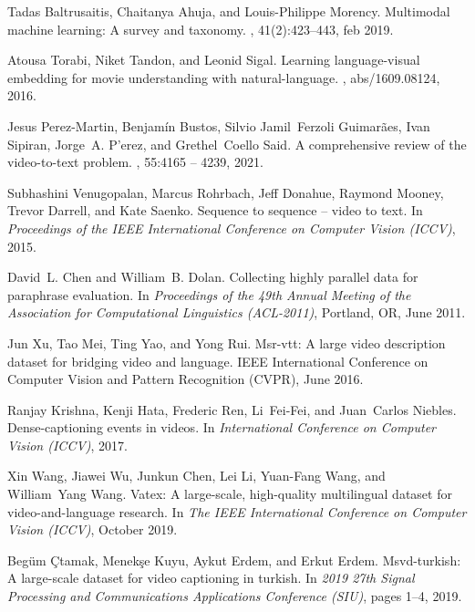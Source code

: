 \documentclass{article}
\begin{document}
\begin{thebibliography}{10}

Tadas Baltrusaitis, Chaitanya Ahuja, and Louis-Philippe Morency.
\newblock Multimodal machine learning: A survey and taxonomy.
, 41(2):423–443, feb
  2019.

Atousa Torabi, Niket Tandon, and Leonid Sigal.
\newblock Learning language-visual embedding for movie understanding with
  natural-language.
, abs/1609.08124, 2016.

Jesus Perez-Martin, Benjam{\'i}n Bustos, Silvio Jamil~Ferzoli Guimar{\~a}es,
  Ivan Sipiran, Jorge~A. P'erez, and Grethel~Coello Said.
\newblock A comprehensive review of the video-to-text problem.
, 55:4165 -- 4239, 2021.

Subhashini Venugopalan, Marcus Rohrbach, Jeff Donahue, Raymond Mooney, Trevor
  Darrell, and Kate Saenko.
\newblock Sequence to sequence -- video to text.
\newblock In {\em Proceedings of the IEEE International Conference on Computer
  Vision (ICCV)}, 2015.

David~L. Chen and William~B. Dolan.
\newblock Collecting highly parallel data for paraphrase evaluation.
\newblock In {\em Proceedings of the 49th Annual Meeting of the Association for
  Computational Linguistics (ACL-2011)}, Portland, OR, June 2011.

Jun Xu, Tao Mei, Ting Yao, and Yong Rui.
\newblock Msr-vtt: A large video description dataset for bridging video and
  language.
\newblock IEEE International Conference on Computer Vision and Pattern
  Recognition (CVPR), June 2016.

Ranjay Krishna, Kenji Hata, Frederic Ren, Li~Fei-Fei, and Juan~Carlos Niebles.
\newblock Dense-captioning events in videos.
\newblock In {\em International Conference on Computer Vision (ICCV)}, 2017.

Xin Wang, Jiawei Wu, Junkun Chen, Lei Li, Yuan-Fang Wang, and William~Yang
  Wang.
\newblock Vatex: A large-scale, high-quality multilingual dataset for
  video-and-language research.
\newblock In {\em The IEEE International Conference on Computer Vision (ICCV)},
  October 2019.

Begüm Çtamak, Menekşe Kuyu, Aykut Erdem, and Erkut Erdem.
\newblock Msvd-turkish: A large-scale dataset for video captioning in turkish.
\newblock In {\em 2019 27th Signal Processing and Communications Applications
  Conference (SIU)}, pages 1--4, 2019.


\end{thebibliography}
\end{document}
